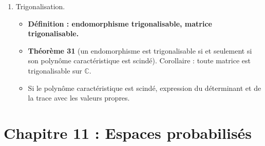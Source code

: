 \documentclass[twoside,a4paper,french,10pt]{VcCours}
\begin{document}
\begin{enumerate}
\begin{itemize}
\end{itemize}
\item Trigonalisation.
\begin{itemize}
\item \textbf{Définition : endomorphisme trigonalisable, matrice trigonalisable.}
\item \textbf{Théorème 31} (un endomorphisme est trigonalisable si et seulement si son polynôme caractéristique est scindé). Corollaire : toute matrice est trigonalisable sur $\mathbb{C}$.
\item Si le polynôme caractéristique est scindé, expression du déterminant et de la trace avec les valeurs propres. 
\end{itemize}
\end{enumerate}

\section*{Chapitre 11 : Espaces probabilisés}
\end{document}
